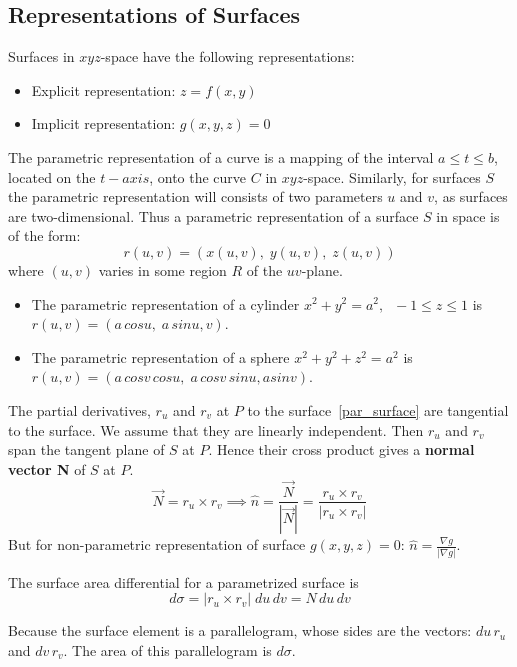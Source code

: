 \documentclass[aima331_lecturenotes_ku.tex]{subfiles}
\begin{document}
\subsection{Representations of Surfaces}
Surfaces in $xyz$-space have the following representations:
\begin{itemize}
\item Explicit representation: $z=f(x,y)$
 \item Implicit representation: $g(x,y,z)=0$
 \end{itemize}
 The parametric representation of a curve is a mapping of the interval $a\leq t \leq b$, located on the $t-axis$, onto the curve $C$ in $xyz$-space. Similarly, for surfaces $S$ the parametric representation will consists of two parameters $u$ and $v$, as surfaces are two-dimensional. Thus a parametric representation of a surface $S$ in space is of the form:
 \begin{equation}
   \label{par_surface}
 r(u,v)=(x(u,v), \; y(u,v), \; z(u,v))
\end{equation}
where $(u,v)$ varies in some region $R$ of the $uv$-plane.
\begin{itemize}
\item The parametric representation of a cylinder $x^2+y^2=a^2, \;\; -1 \leq z \leq 1$ is \\ $r(u,v)=(a\,cosu, \; a\,sinu, v)$.

\item The parametric representation of a sphere $x^2+y^2+z^2=a^2$ is \\ $r(u,v)=(a\,cosv\,cosu, \; a\,cosv\,sinu, asinv) $.
\end{itemize}
The partial derivatives, $r_u$ and $r_v$ at $P$ to the surface~\ref{par_surface} are tangential to the surface. We assume that they are linearly independent. Then $r_u$ and $r_v$ span the tangent plane of $S$ at $P$. Hence their cross product gives a \textbf{normal vector N} of $S$ at $P$.
  \begin{equation}
    \label{surf_normal}
    \vec{N} = r_u \times r_v \implies \hat{n} = \frac{\vec{N}}{|\vec{N}|} = \frac{r_u \times r_v}{|r_u \times r_v|}
  \end{equation}
  But for non-parametric representation of surface $g(x,y,z)=0$: $\displaystyle \hat{n}=\frac{\nabla g}{|\nabla g|}$.
  \begin{mdframed}
    The surface area differential for a parametrized surface is
    \begin{equation}
      \label{surface_diff}
      d\sigma = |r_u \times r_v|\;du\,dv = N\,du\,dv
    \end{equation}
  \end{mdframed}
  Because the surface element is a parallelogram, whose sides are the vectors: $du\,r_u$ and $dv\,r_v$. The area of this parallelogram is $d\sigma$.
\end{document}
